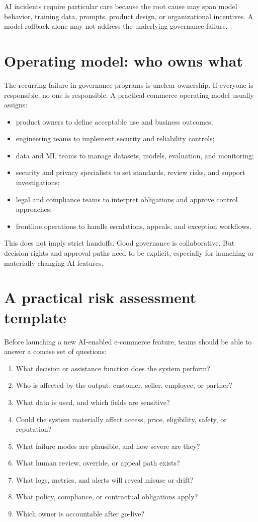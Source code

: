 AI incidents require particular care because the root cause may span model behavior, training data, prompts, product design, or organizational incentives. A model rollback alone may not address the underlying governance failure.

\section{Operating model: who owns what}
The recurring failure in governance programs is unclear ownership. If everyone is responsible, no one is responsible. A practical commerce operating model usually assigns:
\begin{itemize}
  \item product owners to define acceptable use and business outcomes;
  \item engineering teams to implement security and reliability controls;
  \item data and ML teams to manage datasets, models, evaluation, and monitoring;
  \item security and privacy specialists to set standards, review risks, and support investigations;
  \item legal and compliance teams to interpret obligations and approve control approaches;
  \item frontline operations to handle escalations, appeals, and exception workflows.
\end{itemize}

This does not imply strict handoffs. Good governance is collaborative. But decision rights and approval paths need to be explicit, especially for launching or materially changing AI features.

\section{A practical risk assessment template}
Before launching a new AI-enabled e-commerce feature, teams should be able to answer a concise set of questions:
\begin{enumerate}
  \item What decision or assistance function does the system perform?
  \item Who is affected by the output: customer, seller, employee, or partner?
  \item What data is used, and which fields are sensitive?
  \item Could the system materially affect access, price, eligibility, safety, or reputation?
  \item What failure modes are plausible, and how severe are they?
  \item What human review, override, or appeal path exists?
  \item What logs, metrics, and alerts will reveal misuse or drift?
  \item What policy, compliance, or contractual obligations apply?
  \item Which owner is accountable after go-live?
\end{enumerate}

